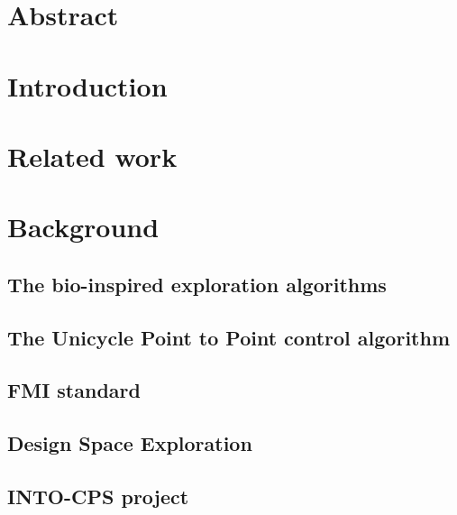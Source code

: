 \documentclass[english]{article}
\begin{document}
\clearpage

\listoffigures

\clearpage

\listoftables

\clearpage

\section*{Abstract}
\thispagestyle{empty}            

\clearpage

\section{Introduction}
\label{Introduction to the thesis work}      

\clearpage

\section{Related work}
\label{Related work}

\section{Background}
\label{Background}

\subsection{The bio-inspired exploration algorithms}
\label{The bio-inspired exploration algorithms}

\subsection{The Unicycle Point to Point control algorithm}
\label{The Unicycle Point to Point control algorithm}

\subsection{FMI standard}
\label{FMU-FMI standard}

\subsection{Design Space Exploration}
\label{Design Space Exploration}

\subsection{INTO-CPS project}
\label{INTO-CPS project}
\end{document}
